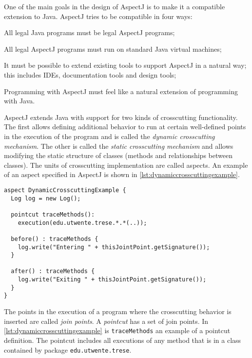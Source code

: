 One of the main goals in the design of AspectJ is to make it a compatible extension to Java.
AspectJ tries to be compatible in four ways:
\begin{description}[style=nextline,noitemsep]
  \item[Upward compatibility] All legal Java programs must be legal AspectJ programs;
  \item[Platform compatibility] All legal AspectJ programs must run on standard Java virtual machines;
  \item[Tool compatibility] It must be possible to extend existing tools to support AspectJ in a natural way; this includes IDEs, documentation tools and design tools;
  \item[Programmer compatibility] Programming with AspectJ must feel like a natural extension of programming with Java.
\end{description}

AspectJ extends Java with support for two kinds of crosscutting functionality.
The first allows defining additional behavior to run at certain well-defined points in the execution of the program and is called the \emph{dynamic crosscutting mechanism}.
The other is called the \emph{static crosscutting mechanism} and allows modifying the static structure of classes (methods and relationships between classes).
The units of crosscutting implementation are called aspects.
An example of an aspect specified in AspectJ is shown in \autoref{lst:dynamiccrosscuttingexample}.

\begin{lstlisting}[language={[AspectJ]Java},style=floatlisting,%
                   caption={Example of dynamic crosscutting in AspectJ},%
                   label={lst:dynamiccrosscuttingexample}]
aspect DynamicCrosscuttingExample {
  Log log = new Log();

  pointcut traceMethods():
    execution(edu.utwente.trese.*.*(..));

  before() : traceMethods {
    log.write("Entering " + thisJointPoint.getSignature());
  }

  after() : traceMethods {
    log.write("Exiting " + thisJointPoint.getSignature());
  }
}
\end{lstlisting}

The points in the execution of a program where the crosscutting behavior is inserted are called \emph{join points}.
A \emph{pointcut} has a set of join points.
In \autoref{lst:dynamiccrosscuttingexample} is \lstinline|traceMethods| an example of a pointcut definition.
The pointcut includes all executions of any method that is in a class contained by package \lstinline|edu.utwente.trese|.

